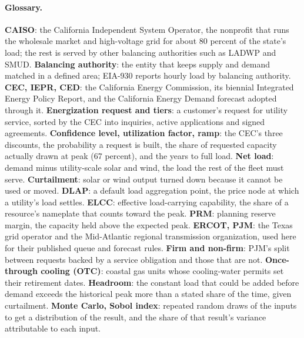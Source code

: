 \paragraph{Glossary.} \textbf{CAISO}: the California Independent System Operator, the nonprofit that runs the wholesale market and high-voltage grid for about 80 percent of the state's load; the rest is served by other balancing authorities such as LADWP and SMUD. \textbf{Balancing authority}: the entity that keeps supply and demand matched in a defined area; EIA-930 reports hourly load by balancing authority. \textbf{CEC, IEPR, CED}: the California Energy Commission, its biennial Integrated Energy Policy Report, and the California Energy Demand forecast adopted through it. \textbf{Energization request and tiers}: a customer's request for utility service, sorted by the CEC into inquiries, active applications and signed agreements. \textbf{Confidence level, utilization factor, ramp}: the CEC's three discounts, the probability a request is built, the share of requested capacity actually drawn at peak (67 percent), and the years to full load. \textbf{Net load}: demand minus utility-scale solar and wind, the load the rest of the fleet must serve. \textbf{Curtailment}: solar or wind output turned down because it cannot be used or moved. \textbf{DLAP}: a default load aggregation point, the price node at which a utility's load settles. \textbf{ELCC}: effective load-carrying capability, the share of a resource's nameplate that counts toward the peak. \textbf{PRM}: planning reserve margin, the capacity held above the expected peak. \textbf{ERCOT, PJM}: the Texas grid operator and the Mid-Atlantic regional transmission organization, used here for their published queue and forecast rules. \textbf{Firm and non-firm}: PJM's split between requests backed by a service obligation and those that are not. \textbf{Once-through cooling (OTC)}: coastal gas units whose cooling-water permits set their retirement dates. \textbf{Headroom}: the constant load that could be added before demand exceeds the historical peak more than a stated share of the time, given curtailment. \textbf{Monte Carlo, Sobol index}: repeated random draws of the inputs to get a distribution of the result, and the share of that result's variance attributable to each input.
